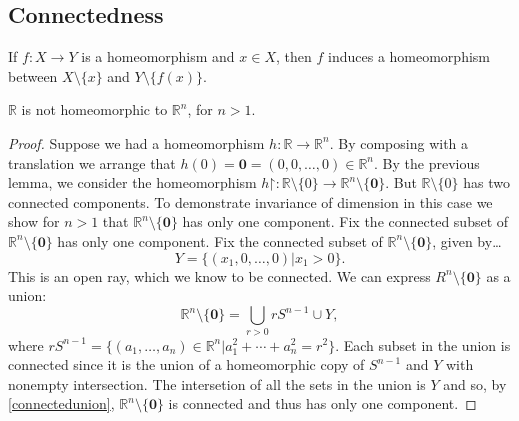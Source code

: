 \subsection{Connectedness}

\begin{lemma}
If $f : X \rightarrow Y$ is a homeomorphism and $x \in X$, then $f$ induces a homeomorphism between $X \setminus \{ x \}$
and $Y \setminus \{ f(x) \}$.
\end{lemma}

\begin{theorem}
$\mathbb{R}$ is not homeomorphic to $\mathbb{R}^n$, for $n > 1$.
\end{theorem}

\begin{proof}
Suppose we had a homeomorphism $h : \mathbb{R} \rightarrow \mathbb{R}^n$. By composing with a translation we arrange that
$h(0) = \mathbf{0} = (0,0,\dots,0) \in \mathbb{R}^n$. By the previous lemma, we consider the homeomorphism $h \mathord{\upharpoonright} : \mathbb{R} \setminus \{ 0 \} \rightarrow \mathbb{R}^n \setminus \{ \mathbf{0} \}.$
But $\mathbb{R} \setminus \{ 0 \}$ has two connected components. To demonstrate invariance of dimension in this case we show for $n > 1$ that $\mathbb{R}^n \setminus \{ \mathbf{0} \}$ has only one component. Fix the
connected subset of $\mathbb{R}^n \setminus \{ \mathbf{0} \}$ has only one component. Fix the connected subset of $\mathbb{R}^n \setminus \{ \mathbf{0} \}$, given by\dots
$$Y = \{(x_1,0, \dots, 0) | x_1 > 0 \}.$$
This is an open ray, which we know to be connected. We can express $R^n \setminus \{ \mathbf{0} \}$ as a union:
$$\mathbb{R}^n \setminus \{ \mathbf{0} \} = \bigcup_{r > 0}rS^{n-1} \cup Y,$$
where $rS^{n-1} = \{ (a_1, \dots, a_n) \in \mathbb{R}^n | a^2_1 + \cdots + a^2_n = r^2 \}.$ Each subset in the union is connected since it is the union of a homeomorphic copy of $S^{n-1}$ and $Y$ with nonempty intersection.
The intersetion of all the sets in the union is $Y$ and so, by \ref{connectedunion}, $\mathbb{R}^n \setminus \{ \mathbf{0} \}$ is connected and thus has only one component.
\end{proof}